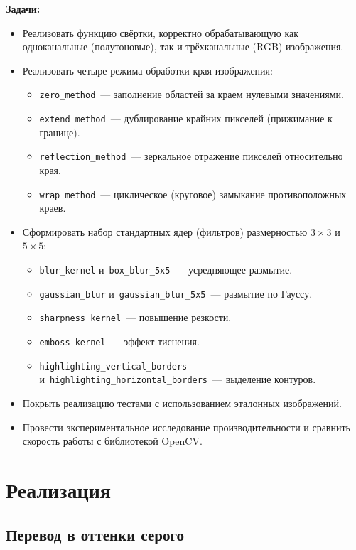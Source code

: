 \documentclass[a4paper]{article}
\begin{document}
\textbf{Задачи:}
\begin{itemize}
    \item Реализовать функцию свёртки, корректно обрабатывающую как одноканальные (полутоновые), так и трёхканальные (RGB) изображения.
    \item Реализовать четыре режима обработки края изображения:
    \begin{itemize}
        \item \verb|zero_method|~--- заполнение областей за краем нулевыми значениями.
        \item \verb|extend_method|~--- дублирование крайних пикселей (прижимание к границе).
        \item \verb|reflection_method|~--- зеркальное отражение пикселей относительно края.
        \item \verb|wrap_method|~--- циклическое (круговое) замыкание противоположных краев.
    \end{itemize}
    \item Сформировать набор стандартных ядер (фильтров) размерностью $3 \times 3$ и $5 \times 5$:
    \begin{itemize}
        \item \verb|blur_kernel| и~\verb|box_blur_5x5|~--- усредняющее размытие.
        \item \verb|gaussian_blur| и~\verb|gaussian_blur_5x5|~--- размытие по Гауссу.
        \item \verb|sharpness_kernel|~--- повышение резкости.
        \item \verb|emboss_kernel|~--- эффект тиснения.
        \item \verb|highlighting_vertical_borders| и~\verb|highlighting_horizontal_borders|~--- выделение контуров.
    \end{itemize}
    \item Покрыть реализацию тестами с использованием эталонных изображений.
    \item Провести экспериментальное исследование производительности и сравнить скорость работы с библиотекой OpenCV.
\end{itemize}

\section{Реализация}

\subsection{Перевод в оттенки серого}
\end{document}
